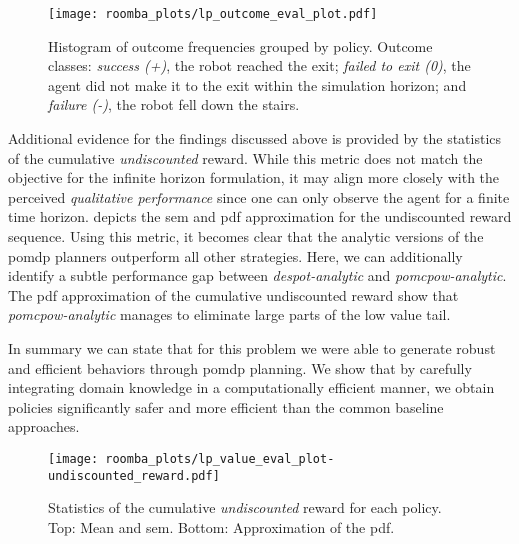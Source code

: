 \begin{figure}[htpb]
  \centering
  \texttt{[image: roomba\_plots/lp\_outcome\_eval\_plot.pdf]}
	\caption{Histogram of outcome frequencies grouped by policy. Outcome
			     classes: \emph{success (+)}, the robot reached the exit; \emph{failed to
				   exit (0)}, the agent did not make it to the exit within the simulation horizon;
		 	 	   and \emph{failure (-)}, the robot fell down the stairs.}
	\label{fig:lp_outcome}
\end{figure}

Additional evidence for the findings discussed above is provided by the
statistics of the cumulative \emph{undiscounted} reward. While this metric does
not match the objective for the infinite horizon formulation, it may align more closely with the
perceived \emph{qualitative performance} since one can only observe the agent
for a finite time horizon.  depicts the \ac{sem}
and \ac{pdf} approximation for the undiscounted reward sequence. Using this
metric, it becomes clear that the analytic versions of the \ac{pomdp} planners
outperform all other strategies. Here, we can additionally identify a subtle
performance gap between \emph{\ac{despot}-analytic} and
\emph{\ac{pomcpow}-analytic}. The \ac{pdf} approximation of the
cumulative undiscounted reward show that \emph{\ac{pomcpow}-analytic} manages
to eliminate large parts of the low value tail.

In summary we can state that for this problem we were able to generate robust
and efficient behaviors through \ac{pomdp} planning. We show that by carefully
integrating domain knowledge in a computationally efficient manner, we obtain
policies significantly safer and more efficient than the common baseline
approaches.

\begin{figure}[htpb]
  \centering
  \texttt{[image: roomba\_plots/lp\_value\_eval\_plot-undiscounted\_reward.pdf]}
  \caption{Statistics of the cumulative \emph{undiscounted} reward for each
  policy. Top: Mean and \acf{sem}. Bottom: Approximation of the \acf{pdf}.}
  \label{fig:lp_eval_undiscounted}
\end{figure}

